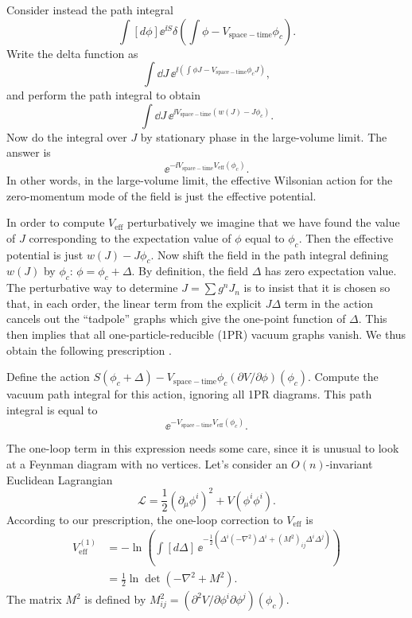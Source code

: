 Consider instead the path integral
\[
  \int[d\phi]\ee^{\ii S}\delta\!\left(\int\phi
  -V_{\mathrm{space-time}}\phi_c\right).
\]
Write the delta function as
\[
  \int\dd J\,\ee^{\ii(\int\phi J-V_{\mathrm{space-time}}\phi_cJ)},
\]
and perform the path integral to obtain
\[
  \int\dd J\,\ee^{\ii V_{\mathrm{space-time}}(w(J)-J\phi_c)}.
\]
Now do the integral over $J$ by stationary phase in the large-volume limit. The
answer is
\[
  \ee^{-\ii V_{\mathrm{space-time}}V_{\mathrm{eff}}(\phi_c)}.
\]
In other words, in the large-volume limit, the effective Wilsonian action for
the zero-momentum mode of the field is just the effective potential.

In order to compute $V_{\mathrm{eff}}$ perturbatively we imagine that we have
found the value of $J$ corresponding to the expectation value of $\phi$ equal
to $\phi_c$. Then the effective potential is just $w(J)-J\phi_c$. Now shift
the field in the path integral defining $w(J)$ by $\phi_c$: $\phi=\phi_c+\Delta$.
By definition, the field $\Delta$ has zero expectation value. The perturbative
way to determine $J=\sum g^nJ_n$ is to insist that it is chosen so that, in
each order, the linear term from the explicit $J\Delta$ term in the action
cancels out the ``tadpole'' graphs which give the one-point function of
$\Delta$. This then implies that all one-particle-reducible (1PR) vacuum graphs vanish. We
thus obtain the following prescription \cite{banks-ref-125}.

Define the action
$S(\phi_c+\Delta)-V_{\mathrm{space-time}}\phi_c(\partial V/\partial\phi)(\phi_c)$.
Compute the vacuum path integral for this action, ignoring all 1PR diagrams.
This path integral is equal to
\[
  \ee^{-V_{\mathrm{space-time}}V_{\mathrm{eff}}(\phi_c)}.
\]

The one-loop term in this expression needs some care, since it is unusual to
look at a Feynman diagram with no vertices. Let's consider an $O(n)$-invariant
Euclidean Lagrangian
\[
  \mathcal{L}=\frac12(\partial_\mu\phi^i)^2+V(\phi^i\phi^i).
\]
According to our prescription, the one-loop correction to $V_{\mathrm{eff}}$
is
\[
\begin{aligned}
  V_{\mathrm{eff}}^{(1)}&=-\ln\left(\int[d\Delta]\,
  \ee^{-\frac12(\Delta^i(-\nabla^2)\Delta^i+(M^2)_{ij}\Delta^i\Delta^j)}\right)\\
  &=\frac12\ln\det(-\nabla^2+M^2).
\end{aligned}
\]
The matrix $M^2$ is defined by
$M_{ij}^2=(\partial^2V/\partial\phi^i\partial\phi^j)(\phi_c)$.

